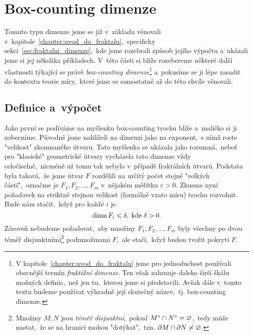 \section{Box-counting dimenze}\label{sec:box-counting-dimenze}

Tomuto typu dimenze jsme se již v~základu věnovali v~kapitole~\ref{chapter:uvod_do_fraktalu},~specificky sekci~\ref{sec:fraktalni_dimenze},~kde jsme rozebrali způsob jejího výpočtu a~ukázali jsme si jej několika příkladech. V~této části si blíže rozebereme některé další vlastnosti týkající se právě \emph{box-counting dimenze}\footnote{V kapitole~\ref{chapter:uvod_do_fraktalu} jsme pro jednoduchost používali obecnější termín \emph{fraktální dimenze}. Ten však zahrnuje daleko širší škálu možných definic,~než jen tu,~kterou jsme si představili. Avšak dále v~tomto textu budeme používat výhradně její skutečný název,~tj. box-counting dimenze.} a~pokusíme se ji lépe zasadit do kontextu teorie míry,~které jsme se samostatně až do této chvíle věnovali.

\subsection{Definice a~výpočet}\label{subsec:definice-a-vypocet-bc-dimenze}

Jako první se podíváme na myšlenku box-counting trochu blíže a~maličko si ji zobecníme. Původně jsme nahlíželi na dimenzi jako na exponent,~s nímž roste "velikost" zkoumaného útvaru. Tato myšlenka se ukázala jako rozumná,~neboť pro "klasické" geometrické útvary vycházela tato dimenze vždy celočíselně,~nicméně už tomu tak nebylo v~případě fraktálních útvarů. Podstata byla taková,~že jsme útvar $F$ rozdělili na určitý počet stejně "velkých částí",~označme je $F_1,F_2,\ldots,F_m$ v~nějakém měřítku $\varepsilon>0$. Zkusme nyní požadavek na striktně stejnou velikost (formálně vzato míru) trochu rozvolnit. Bude nám stačit,~když pro každé $i$ je
\[\operatorname{diam}{F_i}\leqslant\delta,\;\text{kde}\;\delta>0.\]
Zároveň nebudeme požadovat,~aby množiny $F_1,F_2,\ldots,F_m$ byly všechny po dvou téměř disjunktními\footnote{Množiny $M,N$ jsou \emph{téměř disjunktní},~pokud $M^\circ\cap N^\circ=\varnothing$,~tedy může nastat,~že se na hranici mohou "dotýkat",~tzn. $\partial M\cap\partial N\neq\varnothing$.} podmnožinami $F$,~ale stačí,~když budou tvořit pokrytí $F$.

